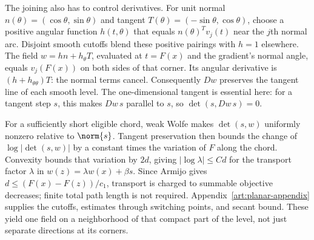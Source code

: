 The joining also has to control derivatives. For unit normal
$n(\theta)=(\cos\theta,\sin\theta)$ and tangent
$T(\theta)=(-\sin\theta,\cos\theta)$, choose a positive angular function
$h(t,\theta)$ that equals $n(\theta)^Tv_j(t)$ near the $j$th normal arc.
Disjoint smooth cutoffs blend these positive pairings with $h=1$ elsewhere.
The field $w=hn+h_\theta T$, evaluated at $t=F(x)$ and the gradient's
normal angle, equals $v_j(F(x))$ on both sides of that corner.
Its angular derivative is $(h+h_{\theta\theta})T$: the normal terms
cancel. Consequently $Dw$ preserves the tangent line of each smooth
level. The one-dimensional tangent is essential here: for a tangent step
$s$, this makes $Dw\,s$ parallel to $s$, so $\det(s,Dw\,s)=0$.

For a sufficiently short eligible chord, weak Wolfe makes
$\det(s,w)$ uniformly nonzero relative to $\norm{s}$. Tangent preservation
then bounds the change of $\log|\det(s,w)|$ by a constant times the
variation of $F$ along the chord. Convexity bounds that variation by
$2d$, giving $|\log\lambda|\le C d$ for the transport factor $\lambda$ in
$w(z)=\lambda w(x)+\beta s$.
Since Armijo gives $d\le(F(x)-F(z))/c_1$, transport is charged to summable
objective decreases; finite total path length is not required.
Appendix~\ref{art:planar-appendix} supplies the cutoffs, estimates through
switching points, and secant bound. These yield one field on a neighborhood
of that compact part of the level, not just separate directions at its corners.

